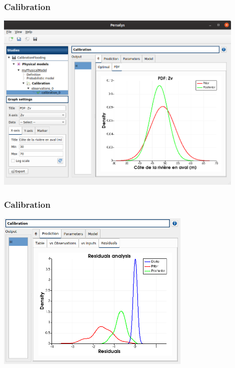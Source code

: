 \documentclass{beamer}
\begin{document}
\begin{frame}
\frametitle{Calibration}
	
\begin{center}
\includegraphics[width=0.9\textwidth]{figures/calibration-Zv-prior-posterior.png}
\end{center}

\end{frame}


\begin{frame}
\frametitle{Calibration}
	
\begin{center}
\includegraphics[width=0.7\textwidth]{figures/calibration-residual-analysis.png}
\end{center}

\end{frame}

\end{document}
